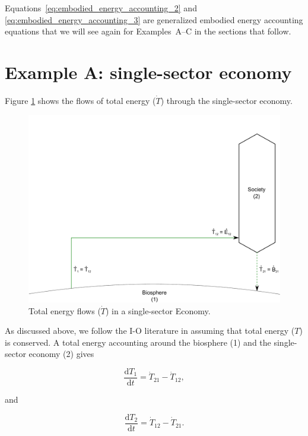 Equations~\ref{eq:embodied_energy_accounting_2}
and \ref{eq:embodied_energy_accounting_3} are generalized
embodied energy accounting equations that we will
see again for Examples~A--C in the sections that follow.


\section{Example A: single-sector economy}

Figure \ref{fig:A_total_energy_T_dot} shows the flows of total energy ($\dot{T}$) through the single-sector economy.

\begin{figure}[h!]
\includegraphics[width=1.0\linewidth]{Part_2/Chapter_Embodied/images/1_sector_embodied_energy.pdf}
\caption{Total energy flows ($\dot{T}$) in a single-sector Economy.}
\label{fig:A_total_energy_T_dot}
\end{figure}

As discussed above, we follow the I-O literature in assuming that 
total energy ($T$) is conserved. 
A total energy accounting around the biosphere (1)
and the single-sector economy (2) gives

\begin{equation} \label{eq:A_T_acct_1}
	\frac{\mathrm{d}T_{1}}{\mathrm{d}t} 
	= \dot{T}_{21} 
	- \dot{T}_{12},
\end{equation}

\noindent and

\begin{equation} \label{eq:A_T_acct_2}
	\frac{\mathrm{d}T_{2}}{\mathrm{d}t} 
	= \dot{T}_{12} 
	- \dot{T}_{21}.
\end{equation}

